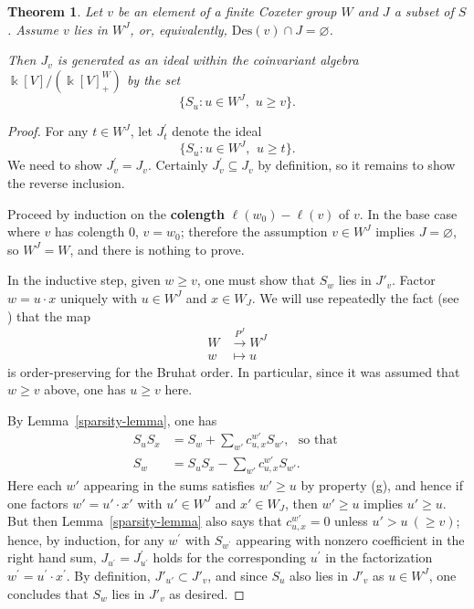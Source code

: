 \documentclass[12pt,dvips]{amsart}
\theoremstyle{plain}
\newtheorem{theorem}{Theorem}[section]
\theoremstyle{definition}
\theoremstyle{remark}
\numberwithin{equation}{section}
\def\Des{\mathrm{Des}}
\begin{document}
\begin{theorem}
\label{general-J-generators}
Let $v$ be an element of a finite Coxeter group $W$ and $J$ a subset
of $S$.  Assume $v$ lies in $W^J$, or, equivalently, $\Des(v) \cap J =
\varnothing$.

Then $J_v$ is generated as an ideal within the coinvariant algebra 
$\Bbbk[V]/(\Bbbk[V]^W_+)$
by the set 
$$
\{ S_u: u \in W^J, \,\,  u \geq v \}.
$$
\end{theorem}
\begin{proof}
For any $t\in W^J$, let $J^\prime_t$ denote the ideal 
$$
\{ S_u: u\in W^J, \,\ u\geq t \}.
$$
We need to show $J^\prime_v=J_v$.
Certainly $J^\prime_v \subseteq J_v$ by definition, so it remains to
show the reverse inclusion.

Proceed by induction on the {\bf colength} $\ell(w_0)-\ell(v)$ of $v$.
In the base case where $v$ has colength $0$, $v=w_0$; therefore the
assumption $v \in W^J$ implies $J=\varnothing$, so $W^J=W$, and there
is nothing to prove.

In the inductive step, given $w \geq v$, one must show that $S_w$ lies
in $J'_v$.  Factor $w=u\cdot x$ uniquely with $u \in W^J$ and $x \in W_J$.
We will use repeatedly 
the fact (see \cite[\S 2.5]{BjornerBrenti}) that the map 
$$
\begin{aligned}
W & \overset{P^J}{\longrightarrow} W^J \\
w &\longmapsto u
\end{aligned}
$$
is order-preserving for the Bruhat order.  In particular, since it
was assumed that $w \geq v$ above, one has $u \geq v$ here.

By Lemma~\ref{sparsity-lemma}, one has
$$
\begin{aligned}
S_u S_x &= S_w + \sum_{w'} c_{u,x}^{w'} S_{w'},\,\,\text{ so that } \\
S_w &= S_u S_x - \sum_{w'} c_{u,x}^{w'} S_{w'}.
\end{aligned}
$$ Here each $w'$ appearing in the sums satisfies $w' \geq u$ by
property (g), and hence if one factors $w'=u' \cdot x'$ with $u' \in
W^J$ and $x' \in W_J$, then $w' \geq u$ implies $u' \geq u$.  But then
Lemma~\ref{sparsity-lemma} also says that $c_{u,x}^{w'}=0$ unless $u'
> u\ (\geq v)$; hence, by induction, for any $w^\prime$ with
$S_{w^\prime}$ appearing with nonzero coefficient in the right hand
sum, $J_{u^\prime}=J^\prime_{u^\prime}$ holds for the corresponding
$u^\prime$ in the factorization $w^\prime=u^\prime\cdot x^\prime$.  By
definition, $J'_{u'} \subset J'_v$, and since $S_u$ also lies in
$J'_v$ as $u \in W^J$, one concludes that $S_w$ lies in $J'_v$ as
desired.
\end{proof}
\end{document}
